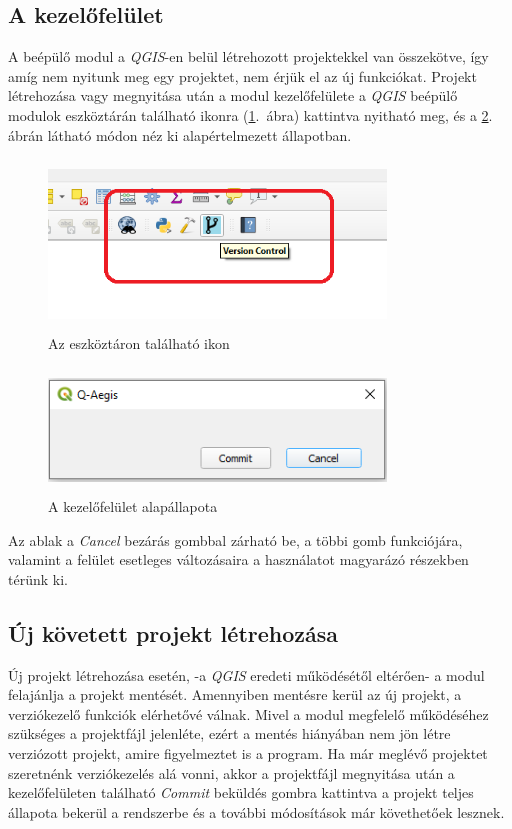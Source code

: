 \subsection{A kezelőfelület}
A beépülő modul a \emph{QGIS}-en belül létrehozott projektekkel van összekötve, így amíg nem nyitunk meg egy projektet, nem érjük el az új funkciókat. Projekt létrehozása vagy megnyitása után a modul kezelőfelülete a \emph{QGIS} beépülő modulok eszköztárán található ikonra (\ref{fig:picture-2}.~ábra) kattintva nyitható meg, és a \ref{fig:picture-3}. ábrán látható módon néz ki alapértelmezett állapotban.
\begin{figure}[H]
	\centering
	\includegraphics[width=0.8\textwidth,height=170px]{images/plugin_button_new.png}
	\caption{Az eszköztáron található ikon}
	\label{fig:picture-2}
\end{figure}
\begin{figure}[H]
	\centering
	\includegraphics[width=0.8\textwidth,height=125px]{images/norepo_state_new.png}
	\caption{A kezelőfelület alapállapota}
	\label{fig:picture-3}
\end{figure}
Az ablak a \emph{Cancel} bezárás gombbal zárható be, a többi gomb funkciójára, valamint a felület esetleges változásaira a használatot magyarázó részekben térünk ki.
\subsection{Új követett projekt létrehozása}
Új projekt létrehozása esetén, -a \emph{QGIS} eredeti működésétől eltérően- a modul felajánlja a projekt mentését. Amennyiben mentésre kerül az új projekt, a verziókezelő funkciók elérhetővé válnak. Mivel a modul megfelelő működéséhez szükséges a projektfájl jelenléte, ezért a mentés hiányában nem jön létre verziózott projekt, amire figyelmeztet is a program.
Ha már meglévő projektet szeretnénk verziókezelés alá vonni, akkor a projektfájl megnyitása után a kezelőfelületen található \emph{Commit} beküldés gombra kattintva a projekt teljes állapota bekerül a rendszerbe és a további módosítások már követhetőek lesznek.

